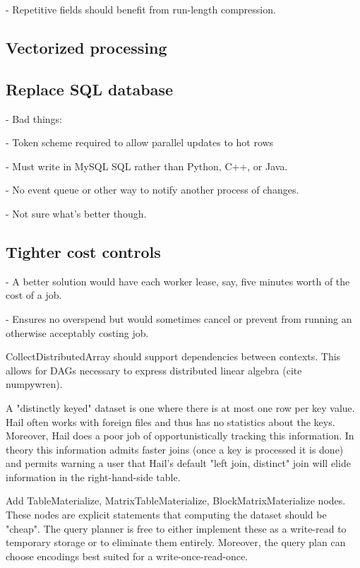 \documentclass[sigconf, nonacm]{acmart}
\begin{document}
    - Repetitive fields should benefit from run-length compression.

\subsection{Vectorized processing}

\subsection{Replace SQL database}

    - Bad things:

      - Token scheme required to allow parallel updates to hot rows

      - Must write in MySQL SQL rather than Python, C++, or Java.

      - No event queue or other way to notify another process of changes.

    - Not sure what’s better though.

\subsection{Tighter cost controls}

    - A better solution would have each worker lease, say, five minutes worth of the cost of a job.

    - Ensures no overspend but would sometimes cancel or prevent from running an otherwise acceptably costing job.

CollectDistributedArray should support dependencies between contexts. This allows for DAGs necessary to express distributed linear algebra (cite numpywren).

A "distinctly keyed" dataset is one where there is at most one row per key value. Hail often works with foreign files and thus has no statistics about the keys. Moreover, Hail does a poor job of opportunistically tracking this information. In theory this information admits faster joins (once a key is processed it is done) and permits warning a user that Hail’s default "left join, distinct" join will elide information in the right-hand-side table.

Add TableMaterialize, MatrixTableMaterialize, BlockMatrixMaterialize nodes. These nodes are explicit statements that computing the dataset should be "cheap". The query planner is free to either implement these as a write-read to temporary storage or to eliminate them entirely. Moreover, the query plan can choose encodings best suited for a write-once-read-once.
\end{document}
